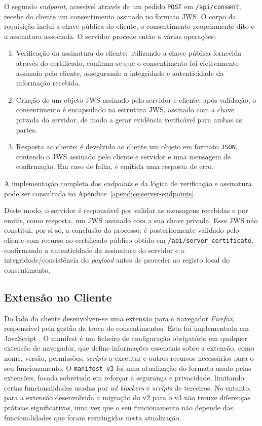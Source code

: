 O segundo \textit{endpoint}, acessível através de um pedido \texttt{POST} em \texttt{/api/consent}, recebe do cliente um consentimento assinado no formato JWS. O corpo da requisição inclui a chave pública do cliente, o consentimento propriamente dito e a assinatura associada. O servidor procede então a várias operações:

\begin{enumerate}
    \item Verificação da assinatura do cliente: utilizando a chave pública fornecida através do certificado, confirma-se que o consentimento foi efetivamente assinado pelo cliente, assegurando a integridade e autenticidade da informação recebida.
    \item Criação de um objeto JWS assinado pelo servidor e cliente: após validação, o consentimento é encapsulado na estrutura JWS, assinado com a chave privada do servidor, de modo a gerar evidência verificável para ambas as partes.
    \item Resposta ao cliente: é devolvido ao cliente um objeto em formato \texttt{JSON}, contendo o JWS assinado pelo cliente e servidor e uma mensagem de confirmação. Em caso de falha, é emitida uma resposta de erro.
\end{enumerate}

A implementação completa dos \textit{endpoints} e da lógica de verificação e assinatura pode ser consultada no Apêndice~\ref{apendice:server-endpoints}.

Deste modo, o servidor é responsável por validar as mensagens recebidas e por emitir, como resposta, um JWS assinado com a sua chave privada. Esse JWS não constitui, por si só, a conclusão do processo: é posteriormente validado pelo cliente com recurso ao certificado público obtido em \texttt{/api/server\_certificate}, confirmando a autenticidade da assinatura do servidor e a integridade/consistência do \textit{payload} antes de proceder ao registo local do consentimento.

\subsection{Extensão no Cliente}
Do lado do cliente desenvolveu-se uma extensão para o navegador \textit{Firefox}, responsável pela gestão da troca de consentimentos. Esta foi implementada em JavaScript \citep{MozillaBrowserExtensions}. O manifest é um ficheiro de configuração obrigatório em qualquer extensão de navegador, que define informações essenciais sobre a extensão, como nome, versão, permissões, \textit{scripts} a executar e outros recursos necessários para o seu funcionamento. O \texttt{manifest v3} foi uma atualização do formato usado pelas extensões, focada sobretudo em reforçar a segurança e privacidade, limitando certas funcionalidades usadas por \textit{ad blockers} e \textit{scripts} de terceiros. No entanto, para a extensão desenvolvida a migração do v2 para o v3 não trouxe diferenças práticas significativas, uma vez que o seu funcionamento não depende das funcionalidades que foram restringidas nesta atualização.

